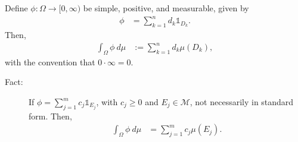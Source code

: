 \documentclass[9pt]{extarticle}
\begin{document}
  Define $\phi: \Omega \rightarrow [0,\infty)$ be simple, positive, and measurable, given by
  \begin{align*}
    \phi &= \sum_{k=1}^{n}d_k\mathbb{1}_{D_k}.\tag*{Standard Form}
  \end{align*}
  Then,
  \begin{align*}
    \int_{\Omega}\phi~d\mu &:= \sum_{k=1}^{n}d_k\mu(D_k),
  \end{align*}
  with the convention that $0 \cdot \infty = 0$.
  \begin{description}
    \item[Fact:] If $\phi = \sum_{j=1}^{m} c_j\mathbb{1}_{E_j}$, with $c_j\geq 0$ and $E_j\in\mathcal{M}$, not necessarily in standard form. Then,
      \begin{align*}
        \int_{\Omega}\phi~d\mu &= \sum_{j=1}^{m}c_j\mu(E_j).
      \end{align*}
  \end{description}
\end{document}
